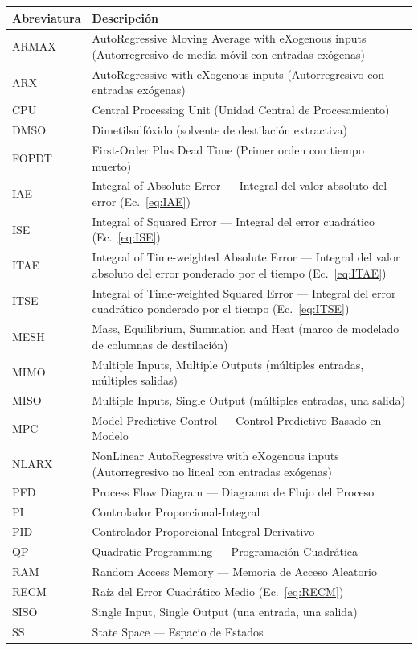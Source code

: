 \begin{tabularx}{\textwidth}{@{} l X @{}}
\toprule
\textbf{Abreviatura} & \textbf{Descripción} \\
\midrule
ARMAX       & AutoRegressive Moving Average with eXogenous inputs (Autorregresivo de media móvil con entradas exógenas) \\
ARX         & AutoRegressive with eXogenous inputs (Autorregresivo con entradas exógenas) \\
CPU         & Central Processing Unit (Unidad Central de Procesamiento) \\
DMSO        & Dimetilsulfóxido (solvente de destilación extractiva) \\
FOPDT       & First-Order Plus Dead Time (Primer orden con tiempo muerto) \\
IAE         & Integral of Absolute Error — Integral del valor absoluto del error (Ec.~\ref{eq:IAE}) \\
ISE         & Integral of Squared Error — Integral del error cuadrático (Ec.~\ref{eq:ISE}) \\
ITAE        & Integral of Time-weighted Absolute Error — Integral del valor absoluto del error ponderado por el tiempo (Ec.~\ref{eq:ITAE}) \\
ITSE        & Integral of Time-weighted Squared Error — Integral del error cuadrático ponderado por el tiempo (Ec.~\ref{eq:ITSE}) \\
MESH        & Mass, Equilibrium, Summation and Heat (marco de modelado de columnas de destilación) \\
MIMO        & Multiple Inputs, Multiple Outputs (múltiples entradas, múltiples salidas) \\
MISO        & Multiple Inputs, Single Output (múltiples entradas, una salida) \\
MPC         & Model Predictive Control — Control Predictivo Basado en Modelo \\
NLARX       & NonLinear AutoRegressive with eXogenous inputs (Autorregresivo no lineal con entradas exógenas) \\
PFD         & Process Flow Diagram — Diagrama de Flujo del Proceso \\
PI          & Controlador Proporcional-Integral \\
PID         & Controlador Proporcional-Integral-Derivativo \\
QP          & Quadratic Programming — Programación Cuadrática \\
RAM         & Random Access Memory — Memoria de Acceso Aleatorio \\
RECM        & Raíz del Error Cuadrático Medio (Ec.~\ref{eq:RECM}) \\
SISO        & Single Input, Single Output (una entrada, una salida) \\
SS          & State Space — Espacio de Estados \\
\bottomrule
\end{tabularx}